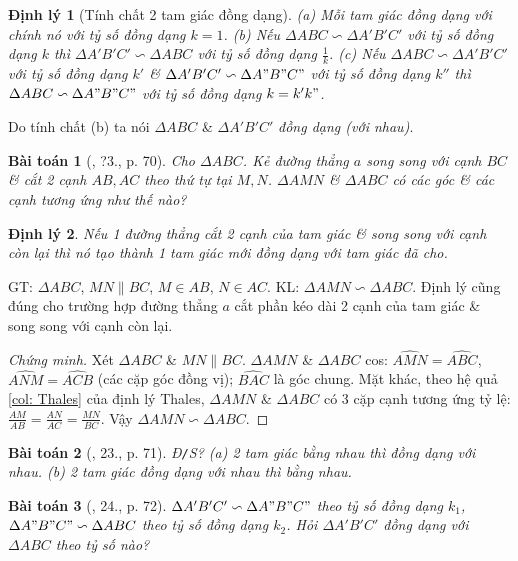 \documentclass{article}
\newtheorem{baitoan}{Bài toán}
\newtheorem{dinhly}{Định lý}
\begin{document}
\begin{dinhly}[Tính chất 2 tam giác đồng dạng]
	(a) Mỗi tam giác đồng dạng với chính nó với tỷ số đồng dạng $k = 1$. (b) Nếu $\Delta ABC\backsim\Delta A'B'C'$ với tỷ số đồng dạng $k$ thì $\Delta A'B'C'\backsim\Delta ABC$ với tỷ số đồng dạng $\frac{1}{k}$. (c) Nếu $\Delta ABC\backsim\Delta A'B'C'$ với tỷ số đồng dạng $k'$ \& $\Delta A'B'C'\backsim\Delta A"B"C"$ với tỷ số đồng dạng $k''$ thì $\Delta ABC\backsim\Delta A"B"C"$ với tỷ số đồng dạng $k = k'k"$.
\end{dinhly}
Do tính chất (b) ta nói $\Delta ABC$ \& $\Delta A'B'C'$ \textit{đồng dạng (với nhau)}.

\begin{baitoan}[\cite{SGK_Toan_8_tap_2}, ?3., p. 70]
	Cho $\Delta ABC$. Kẻ đường thẳng $a$ song song với cạnh $BC$ \& cắt 2 cạnh $AB,AC$ theo thứ tự tại $M,N$. $\Delta AMN$ \& $\Delta ABC$ có các góc \& các cạnh tương ứng như thế nào?
\end{baitoan}

\begin{dinhly}
	Nếu 1 đường thẳng cắt 2 cạnh của tam giác \& song song với cạnh còn lại thì nó tạo thành 1 tam giác mới đồng dạng với tam giác đã cho.
\end{dinhly}
GT: $\Delta ABC$, $MN\parallel BC$, $M\in AB$, $N\in AC$. KL: $\Delta AMN\backsim\Delta ABC$. Định lý cũng đúng cho trường hợp đường thẳng $a$ cắt phần kéo dài 2 cạnh của tam giác \& song song với cạnh còn lại.

\begin{proof}[Chứng minh]
	Xét $\Delta ABC$ \& $MN\parallel BC$. $\Delta AMN$ \& $\Delta ABC$ cos: $\widehat{AMN} = \widehat{ABC}$, $\widehat{ANM} = \widehat{ACB}$ (các cặp góc đồng vị); $\widehat{BAC}$ là góc chung. Mặt khác, theo hệ quả \ref{col: Thales} của định lý Thales, $\Delta AMN$ \& $\Delta ABC$ có 3 cặp cạnh tương ứng tỷ lệ: $\frac{AM}{AB} = \frac{AN}{AC} = \frac{MN}{BC}$. Vậy $\Delta AMN\backsim\Delta ABC$.
\end{proof}

\begin{baitoan}[\cite{SGK_Toan_8_tap_2}, 23., p. 71]
	\emph{Đ\texttt{/}S?} (a) 2 tam giác bằng nhau thì đồng dạng với nhau. (b) 2 tam giác đồng dạng với nhau thì bằng nhau.
\end{baitoan}

\begin{baitoan}[\cite{SGK_Toan_8_tap_2}, 24., p. 72]
	$\Delta A'B'C'\backsim\Delta A"B"C"$ theo tỷ số đồng dạng $k_1$, $\Delta A"B"C"\backsim\Delta ABC$ theo tỷ số đồng dạng $k_2$. Hỏi $\Delta A'B'C'$ đồng dạng với $\Delta ABC$ theo tỷ số nào?
\end{baitoan}
\end{document}
